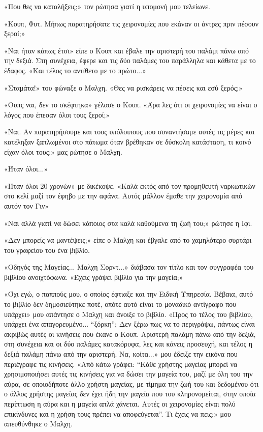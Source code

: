 \documentclass[12pt,twoside, openany]{book}
\begin{document}
«Που θες να καταλήξεις;» τον ρώτησα γιατί η υπομονή μου τελείωνε.

«Κουπ, Φυτ. Μήπως παρατηρήσατε τις χειρονομίες που εκάναν οι άντρες πριν πέσουν ξεροί;»

«Ναι ήταν κάπως έτσι» είπε ο Κουπ και έβαλε την αριστερή του παλάμι πάνω από την δεξιά. Στη συνέχεια, έφερε και τις δύο παλάμες του παράλληλα και κάθετα με το έδαφος. «Και τέλος το αντίθετο με το πρώτο...»

«Σταμάτα!» του φώναξε ο Μαλχη. «Θες να ρισκάρεις να πέσεις και εσύ ξερός;»

«Ουπς ναι, δεν το σκέφτηκα» γέλασε ο Κουπ. «Άρα λες ότι οι χειρονομίες να είναι ο λόγος που έπεσαν όλοι τους ξεροί;»

«Ναι. Αν παρατηρήσουμε και τους υπόλοιπους που συναντήσαμε αυτές τις μέρες και κατέληξαν ξαπλωμένοι στο πάτωμα όταν βρέθηκαν σε δύσκολη κατάσταση, τι κοινό είχαν όλοι τους;» μας ρώτησε ο Μαλχη.

«Ήταν όλοι...»

«Ήταν όλοι 20 χρονών» με δικέκοψε. «Καλά εκτός από τον προμηθευτή ναρκωτικών στο κελί μαζί τον έφηβο με την αφάνα. Αυτός μάλλον έμαθε την χειρονομία από αυτόν τον Γιν»

«Ναι αλλά γιατί να δώσει κάποιος στα καλά καθούμενα τη ζωή του;» ρώτησε η Ιφι.

«Δεν μπορείς να μαντέψεις;» είπε ο Μαλχη και έβγαλε από το χαμηλότερο συρτάρι του γραφείου του ένα βιβλίο.

«Οδηγός της Μαγείας... Μαλχη Σορντ...» διάβασα τον τίτλο και τον συγγραφέα του βιβλίου ανοιχτόφωνα. «Έχεις γράψει βιβλίο για την μαγεία;»

«Όχι εγώ, ο παππούς μου, ο οποίος έφτιαξε και την Ειδική Υπηρεσία. Βέβαια, αυτό το βιβλίο δεν δημοσιεύτηκε ποτέ, οπότε αυτό είναι το μοναδικό αντίγραφο που υπάρχει» μου απάντησε ο Μαλχη και άνοιξε το βιβλίο. «Προς το τέλος του βιβλίου, υπάρχει ένα απαγορευμένο... “ξόρκη”; Δεν ξέρω πως να το περιγράψω, πάντως είναι ακριβώς αυτές οι κινήσεις που έκανε ο Κουπ. Αριστερή παλάμη πάνω από την δεξιά, στη συνέχεια και οι δύο παλάμες κατακόρυφα, λες και κάνεις προσευχή, και τέλος η δεξιά παλάμη πάνω από την αριστερή. Να, κοίτα...» μου έδειξε την εικόνα που περιέγραφε τις κινήσεις. «Από κάτω γράφει: “Κάθε χρήστης μαγείας μπορεί να χρησιμοποιήσει αυτές τις κινήσεις για να δώσει την μαγεία του, μαζί με όλη του την αύρα, σε οποιοδήποτε άλλο χρήστη μαγείας, με τίμημα την ζωή του και δεδομένου ότι ο άλλος χρήστης μαγείας δεν έχει ήδη την μαγεία που του κληρονομείται, στην οποία περίπτωση η αύρα και η μαγεία απλά χάνεται. Αυτές οι χειρονομίες είναι πολύ επικίνδυνες και η χρήση τους πρέπει να αποφεύγεται”. Τι έχεις να πεις;» μου απευθύνθηκε ο Μαλχη.
\end{document}
